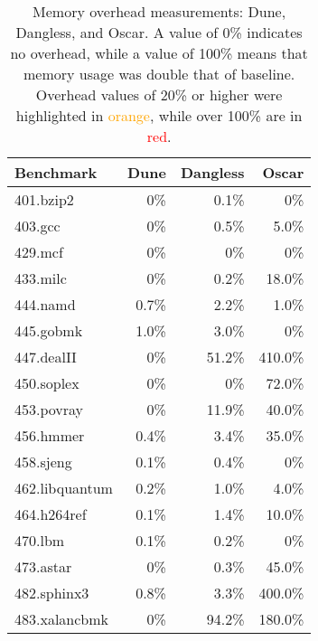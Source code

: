 \begin{table}[]
	\centering
	\begin{tabular}{|l|r|r|r|}
		\hline
		\textbf{Benchmark} & \textbf{Dune} & \textbf{Dangless} & \textbf{Oscar} \\ \hline
		401.bzip2          & 0\%         & 0.1\%             & 0\%          \\ \hline
		403.gcc            & 0\%         & 0.5\%             & 5.0\%          \\ \hline
		429.mcf            & 0\%         & 0\%             & 0\%          \\ \hline
		433.milc           & 0\%         & 0.2\%             & 18.0\%          \\ \hline
		444.namd           & 0.7\%         & 2.2\%             & 1.0\%          \\ \hline
		445.gobmk          & 1.0\%         & 3.0\%             & 0\%          \\ \hline
		447.dealII         & 0\%         & {\color{orange} 51.2\%}             & {\color{red} 410.0\%}          \\ \hline
		450.soplex         & 0\%         & 0\%             & {\color{orange} 72.0\%}          \\ \hline
		453.povray         & 0\%         & 11.9\%             & {\color{orange} 40.0\%}          \\ \hline
		456.hmmer          & 0.4\%         & 3.4\%             & {\color{orange} 35.0\%}          \\ \hline
		458.sjeng          & 0.1\%         & 0.4\%             & 0\%          \\ \hline
		462.libquantum     & 0.2\%         & 1.0\%             & 4.0\%          \\ \hline
		464.h264ref        & 0.1\%         & 1.4\%             & 10.0\%          \\ \hline
		470.lbm            & 0.1\%         & 0.2\%             & 0\%          \\ \hline
		473.astar          & 0\%         & 0.3\%             & {\color{orange} 45.0\%}          \\ \hline
		482.sphinx3        & 0.8\%         & 3.3\%             & {\color{red} 400.0\%}          \\ \hline
		483.xalancbmk      & 0\%         & {\color{orange} 94.2\%}             & {\color{red} 180.0\%}          \\ \hline
	\end{tabular}
	\caption{Memory overhead measurements: Dune, Dangless, and Oscar. A value of 0\% indicates no overhead, while a value of 100\% means that memory usage was double that of baseline. Overhead values of 20\% or higher were highlighted in \textcolor{orange}{orange}, while over 100\% are in \textcolor{red}{red}.}
	\label{tab:mem-dune-dangless-oscar}
\end{table}

